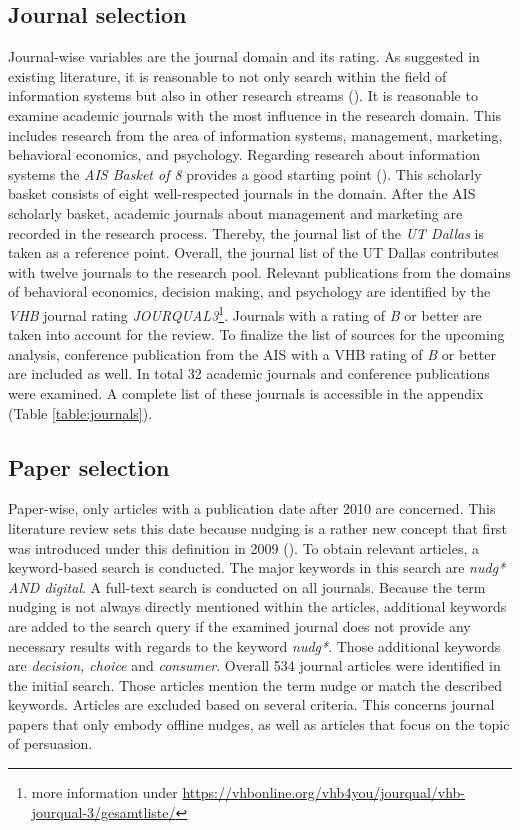 \subsection{Journal selection}
Journal-wise variables are the journal domain and its rating. As suggested in existing literature, it is reasonable to not only search within the field of information systems but also in other research streams (\cite{webster_analyzing_2002}). It is reasonable to examine academic journals with the most influence in the research domain. This includes research from the area of information systems, management, marketing, behavioral economics, and psychology. Regarding research about information systems the \textit{AIS Basket of 8} provides a good starting point (\cite{alavi_review_1992}). This scholarly basket consists of eight well-respected journals in the domain. After the AIS scholarly basket, academic journals about management and marketing are recorded in the research process. Thereby, the journal list of the \textit{UT Dallas} is taken as a reference point. Overall, the journal list of the UT Dallas contributes with twelve journals to the research pool. 
Relevant publications from the domains of behavioral economics, decision making, and psychology are identified by the \textit{VHB} journal rating \textit{JOURQUAL3}\footnote{more information under \url{https://vhbonline.org/vhb4you/jourqual/vhb-jourqual-3/gesamtliste/}}. Journals with a rating of \textit{B} or better are taken into account for the review.
To finalize the list of sources for the upcoming analysis, conference publication from the AIS with a VHB rating of \textit{B} or better are included as well. In total 32 academic journals and conference publications were examined. A complete list of these journals is accessible in the appendix (Table \ref{table:journals}).

\subsection{Paper selection}
Paper-wise, only articles with a publication date after 2010 are concerned. This literature review sets this date because nudging is a rather new concept that first was introduced under this definition in 2009 (\cite{thaler_nudge:_2009}). To obtain relevant articles, a keyword-based search is conducted. The major keywords in this search are \textit{nudg* AND digital}. A full-text search is conducted on all journals. Because the term nudging is not always directly mentioned within the articles, additional keywords are added to the search query if the examined journal does not provide any necessary results with regards to the keyword \textit{nudg*}. Those additional keywords are \textit{decision, choice} and \textit{consumer}. Overall 534 journal articles were identified in the initial search. Those articles mention the term nudge or match the described keywords. Articles are excluded based on several criteria. This concerns journal papers that only embody offline nudges, as well as articles that focus on the topic of persuasion. 
\\

